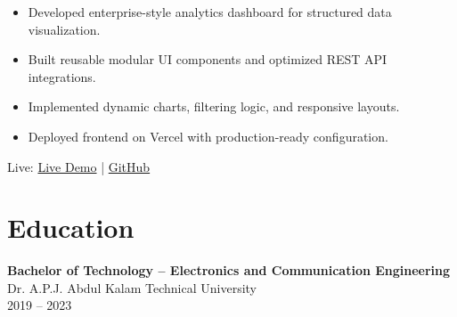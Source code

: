 \documentclass[letterpaper,11pt]{article}
\begin{document}
\begin{itemize}
\item Developed enterprise-style analytics dashboard for structured data visualization.
\item Built reusable modular UI components and optimized REST API integrations.
\item Implemented dynamic charts, filtering logic, and responsive layouts.
\item Deployed frontend on Vercel with production-ready configuration.
\end{itemize}

Live: \href{https://ai-insight-dashboard-dusky.vercel.app}{Live Demo} \quad | \quad
\href{https://github.com/Ujjuanku/ai-insight-dashboard}{GitHub}

\section{Education}

\textbf{Bachelor of Technology – Electronics and Communication Engineering} \\
Dr. A.P.J. Abdul Kalam Technical University \\
2019 -- 2023
\end{document}
